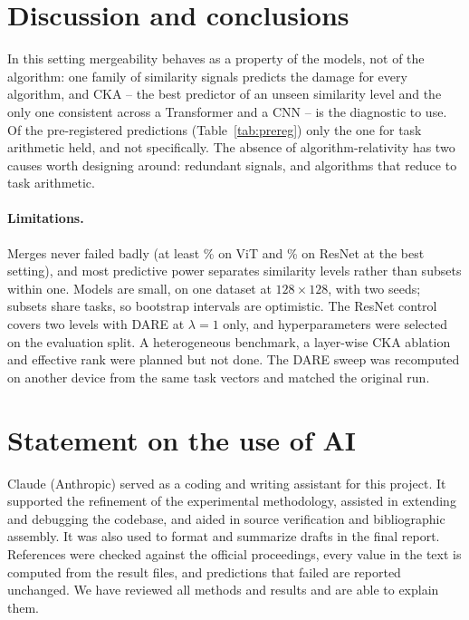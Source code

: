 \documentclass{article}
\begin{document}
\section{Discussion and conclusions}\label{sec:discussion}

In this setting mergeability behaves as a property of the models, not of the algorithm: one family of similarity signals predicts the damage for every algorithm, and CKA -- the best predictor of an unseen similarity level and the only one consistent across a Transformer and a CNN -- is the diagnostic to use. Of the pre-registered predictions (Table~\ref{tab:prereg}) only the one for task arithmetic held, and not specifically. The absence of algorithm-relativity has two causes worth designing around: redundant signals, and algorithms that reduce to task arithmetic.

\paragraph{Limitations.} Merges never failed badly (at least \tunedMinVit\% on ViT and \tunedMinRes\% on ResNet at the best setting), and most predictive power separates similarity levels rather than subsets within one. Models are small, on one dataset at $128\times128$, with two seeds; subsets share tasks, so bootstrap intervals are optimistic. The ResNet control covers two levels with DARE at $\lambda = 1$ only, and hyperparameters were selected on the evaluation split. A heterogeneous benchmark, a layer-wise CKA ablation and effective rank were planned but not done. The DARE sweep was recomputed on another device from the same task vectors and matched the original run.

\section{Statement on the use of AI}\label{sec:ai}
Claude (Anthropic) served as a coding and writing assistant for this project. It supported the refinement of the experimental methodology, assisted in extending and debugging the codebase, and aided in source verification and bibliographic assembly. It was also used to format and summarize drafts in the final report. References were checked against the official proceedings, every value in the text is computed from the result files, and predictions that failed are reported unchanged. We have reviewed all methods and results and are able to explain them.



\end{document}
